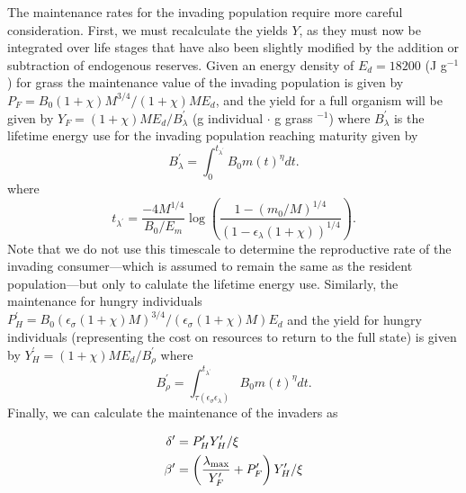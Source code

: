 \documentclass{pnastwo}
\begin{document}
\begin{article}
The maintenance rates for the invading population require more careful consideration.
First, we must recalculate the yields $Y$, as they must now be integrated over life stages that have also been slightly modified by the addition or subtraction of endogenous reserves.
Given an energy density of $E_{d}=18200$ (J g$^{-1}$) for grass \cite{estermann} the maintenance value of the invading population is given by $P_{F}=B_{0}(1+\chi)M^{3/4}/(1+\chi)ME_{d}$, and the yield for a full organism will be given by $Y_{F}=(1+\chi)ME_{d}/B^{\prime}_{\lambda}$ (g individual $\cdot$ g grass $^{-1}$) where $B^{\prime}_{\lambda}$ is the lifetime energy use for the invading population reaching maturity given by
\begin{equation}
B^{\prime}_{\lambda}=\int_{0}^{t_{\lambda^\prime}}B_{0}m\left(t\right)^{\eta}dt.
\end{equation}
where
\begin{equation}
t_{\lambda^\prime} = \frac{-4 M^{1/4} }{B_0/E_m}\log \left(\frac{1-(m_0/M)^{1/4}}{(1-\epsilon_\lambda (1+\chi))^{1/4}} \right).
\end{equation}
Note that we do not use this timescale to determine the reproductive rate of the invading consumer---which is assumed to remain the same as the resident population---but only to calulate the lifetime energy use.
Similarly, the maintenance for hungry individuals $P^\prime_{H}=B_{0}(\epsilon_{\sigma}(1+\chi)M)^{3/4}/(\epsilon_{\sigma}(1+\chi)M)E_{d}$ and the yield for hungry individuals (representing the cost on resources to return to the full state) is given by $Y^\prime_{H}=(1+\chi)ME_{d}/B^{\prime}_{\rho}$ where
\begin{equation}
B^{\prime}_{\rho}=\int_{\tau\left(\epsilon_{\sigma}\epsilon_{\lambda}\right)}^{t_{\lambda^\prime}}B_{0}m\left(t\right)^{\eta}dt.
\end{equation}
Finally, we can calculate the maintenance of the invaders as

\begin{align}
  \delta^\prime &= P^\prime_{H}Y^\prime_{H}/\xi \\ \nonumber
  \beta^\prime &= \left(\frac{\lambda_{\rm max}}{Y^\prime_{F}}+P^\prime_{F} \right)Y^\prime_{H}/\xi
\end{align}















\end{article}
\end{document}
